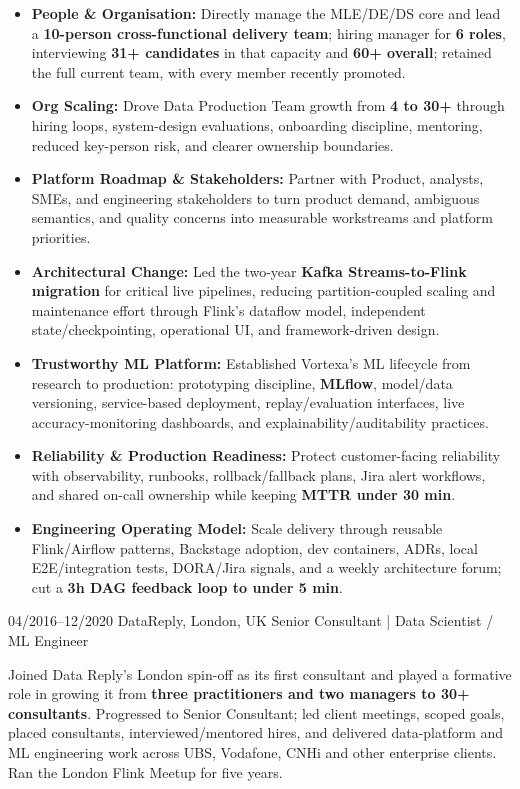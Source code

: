 \documentclass[]{../../../../friggeri-cv}
\begin{document}
\begin{entrylist}
{{        }
        \begin{itemize}[leftmargin=1.1em]
            \item \footnotesize\textbf{People \& Organisation:} Directly manage the MLE/DE/DS core and lead a \textbf{10-person cross-functional delivery team}; hiring manager for \textbf{6 roles}, interviewing \textbf{31+ candidates} in that capacity and \textbf{60+ overall}; retained the full current team, with every member recently promoted.
            \item \footnotesize\textbf{Org Scaling:} Drove Data Production Team growth from \textbf{4 to 30+} through hiring loops, system-design evaluations, onboarding discipline, mentoring, reduced key-person risk, and clearer ownership boundaries.
            \item \footnotesize\textbf{Platform Roadmap \& Stakeholders:} Partner with Product, analysts, SMEs, and engineering stakeholders to turn product demand, ambiguous semantics, and quality concerns into measurable workstreams and platform priorities.
            \item \footnotesize\textbf{Architectural Change:} Led the two-year \textbf{Kafka Streams-to-Flink migration} for critical live pipelines, reducing partition-coupled scaling and maintenance effort through Flink's dataflow model, independent state/checkpointing, operational UI, and framework-driven design.
            \item \footnotesize\textbf{Trustworthy ML Platform:} Established Vortexa's ML lifecycle from research to production: prototyping discipline, \textbf{MLflow}, model/data versioning, service-based deployment, replay/evaluation interfaces, live accuracy-monitoring dashboards, and explainability/auditability practices.
            \item \footnotesize\textbf{Reliability \& Production Readiness:} Protect customer-facing reliability with observability, runbooks, rollback/fallback plans, Jira alert workflows, and shared on-call ownership while keeping \textbf{MTTR under 30 min}.
            \item \footnotesize\textbf{Engineering Operating Model:} Scale delivery through reusable Flink/Airflow patterns, Backstage adoption, dev containers, ADRs, local E2E/integration tests, DORA/Jira signals, and a weekly architecture forum; cut a \textbf{3h DAG feedback loop to under 5 min}.
        \end{itemize}
    }
    \entry
    {04/2016--12/2020}
    {DataReply, London, UK}
    {Senior Consultant | Data Scientist / ML Engineer}
    {
        {\small
        \setlength{\parindent}{0pt}
        \setlength{\leftskip}{0pt}
        Joined Data Reply's London spin-off as its first consultant and played a formative role in growing it from \textbf{three practitioners and two managers to 30+ consultants}. Progressed to Senior Consultant; led client meetings, scoped goals, placed consultants, interviewed/mentored hires, and delivered data-platform and ML engineering work across UBS, Vodafone, CNHi and other enterprise clients. Ran the London Flink Meetup for five years.

}}
\end{entrylist}
\end{document}
